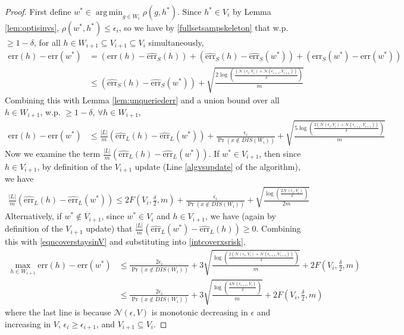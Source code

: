 \documentclass{article}[12pt]
\theoremstyle{named}
\DeclareMathOperator*{\argmin}{arg\,min}
\DeclareMathOperator{\Prtxt}{Pr}
\newcommand{\abs}[1]{\left| #1 \right|}
\newcommand{\prp}[2]{\Prtxt_{#2} \left(#1\right)}
\newcommand{\err}[1]{\mbox{err}\left(#1\right)}
\newcommand{\emperr}[2]{\widehat{\mbox{err}}_{#2} \left(#1\right)}
\newcommand{\cN}{\mathcal{N}}
\newcommand{\lrp}[1]{\left(#1\right)}
\begin{document}
\begin{proof}
First define $\displaystyle w^* \in \argmin_{g \in W_i} \rho (g, h^*)$. 
Since $h^* \in V_i$ by Lemma \ref{lem:optisinvs}, $\rho(w^*, h^*) \leq \epsilon_i$, so
we have by \eqref{fullsetsampskeleton} that w.p. $\geq 1- \delta$, 
for all $h \in W_{i+1} \subseteq V_{i+1} \subseteq V_i$ simultaneously, 
\begin{align*}
\err{h} - \err{w^*} &= \lrp{\err{h} - \emperr{h}{S}} + \lrp{\emperr{h}{S} - \emperr{w^*}{S}} + \lrp{\emperr{w^*}{S} - \err{w^*}} \\
&\leq \lrp{\emperr{h}{S} - \emperr{w^*}{S}} + \sqrt{\frac{2 \log \lrp{\frac{ \lrp{\cN (\epsilon_i, V_i) + \cN (\epsilon_{i+1}, V_{i+1}) } }{\delta}} }{ m }}
\end{align*}
Combining this with Lemma \ref{lem:unqueriederr} and a union bound over all $h \in W_{i+1}$, 
w.p. $\geq 1- \delta$, $\forall h \in W_{i+1}$, 
\begin{align}
\label{intcoverxsrisk}
\err{h} - \err{w^*} &\leq \frac{\abs{L}}{m} \lrp{ \emperr{h}{L} - \emperr{w^*}{L} } + \frac{\epsilon_i}{\prp{x \notin DIS(W_i)}{}} 
+ \sqrt{\frac{ 5 \log \lrp{\frac{ 2 \lrp{\cN (\epsilon_i, V_i) + \cN (\epsilon_{i+1}, V_{i+1}) } }{\delta}} }{ m }}
\end{align}
Now we examine the term $\frac{\abs{L}}{m} \lrp{ \emperr{h}{L} - \emperr{w^*}{L} }$. 
If $w^* \in V_{i+1}$, 
then since $h \in V_{i+1}$,
by definition of the $V_{i+1}$ update (Line \ref{algvsupdate} of the algorithm), 
we have 
\begin{align}
\label{eqncoverstaysinV}
\frac{\abs{L}}{m} \lrp{ \emperr{h}{L} - \emperr{w^*}{L} } \leq 2 F \lrp{ V_i, \frac{\delta}{2}, m } + \frac{\epsilon_i}{\prp{x \notin DIS(W_i)}{}} 
+ \sqrt{\frac{\log \lrp{\frac{ 2 \cN (\epsilon_i, V_i) }{\delta}} }{2m }}
\end{align}
Alternatively, if $w^* \notin V_{i+1}$, 
since $w^* \in V_i$ and $h \in V_{i+1}$, 
we have (again by definition of the $V_{i+1}$ update) that 
$\frac{\abs{L}}{m} \lrp{ \emperr{w^*}{L} - \emperr{h}{L} } \geq 0$. 
Combining this with \eqref{eqncoverstaysinV} and substituting into \eqref{intcoverxsrisk},
\begin{align}
\label{excessriskcovtocov}
\max_{h \in W_{i+1}} \err{h} - \err{w^*} &\leq \frac{2 \epsilon_i}{\prp{x \notin DIS(W_i)}{}} 
+ 3 \sqrt{\frac{ \log \lrp{\frac{ 2 \lrp{\cN (\epsilon_i, V_i) + \cN (\epsilon_{i+1}, V_{i+1}) } }{\delta}} }{ m }} 
+ 2 F \lrp{ V_i, \frac{\delta}{2}, m } \nonumber \\
&\leq \frac{2 \epsilon_i}{\prp{x \notin DIS(W_i)}{}} 
+ 3 \sqrt{\frac{ \log \lrp{\frac{ 4 \cN (\epsilon_{i+1}, V_i) }{\delta}} }{ m }} 
+ 2 F \lrp{ V_i, \frac{\delta}{2}, m }
\end{align}
where the last line is because $\cN (\epsilon, V)$ is monotonic decreasing in $\epsilon$ and increasing in $V$, 
$\epsilon_i \geq \epsilon_{i+1}$, and $V_{i+1} \subseteq V_i$.


\end{proof}
\end{document}

